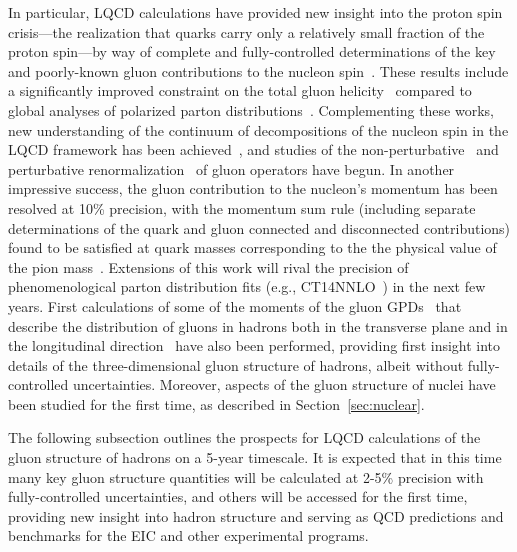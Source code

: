 In particular, LQCD calculations have provided new insight into the proton spin crisis---the realization that quarks carry only a relatively small fraction of the proton spin---by way of complete and fully-controlled determinations of the key and poorly-known gluon contributions to the nucleon spin~\cite{Alexandrou:2017oeh,Yang:2016plb}. 
These results include a significantly improved constraint on the total gluon helicity~\cite{Yang:2016plb} compared to global analyses of polarized parton distributions~\cite{deFlorian:2014yva}.
Complementing these works, new understanding of the continuum of decompositions of the nucleon spin in the LQCD framework has been achieved~\cite{Engelhardt:2017miy}, and studies of the non-perturbative~\cite{paper by Yibo et al to appear next week} and perturbative renormalization~\cite{Alexandrou:2017oeh} of gluon operators have begun.
%
In another impressive success, the gluon contribution to the nucleon's momentum has been resolved at 10\% precision, with the momentum sum rule (including separate determinations of the quark and gluon connected and disconnected contributions) found to be satisfied at quark masses corresponding to the the physical value of the pion mass~\cite{Alexandrou:2017oeh}. Extensions of this work will rival the precision of phenomenological parton distribution fits (e.g., CT14NNLO~\cite{Dulat:2015mca}) in the next few years.
%
First calculations of some of the moments of the gluon GPDs~\cite{Diehl:2003ny} that describe the distribution of gluons in hadrons both in the transverse plane and in the longitudinal direction~\cite{Detmold:2016gpy,Detmold:2017oqb} have also been performed, providing first insight into details of the three-dimensional gluon structure of hadrons, albeit without fully-controlled uncertainties. 
Moreover, aspects of the gluon structure of nuclei have been studied for the first time, as described in Section~\ref{sec:nuclear}.

The following subsection outlines the prospects for LQCD calculations of the gluon structure of hadrons on a 5-year timescale. It is expected that in this time many key gluon structure quantities will be calculated at 2-5\% precision with fully-controlled uncertainties, and others will be accessed for the first time, providing new insight into hadron structure and serving as QCD predictions and benchmarks for the EIC and other experimental programs.




